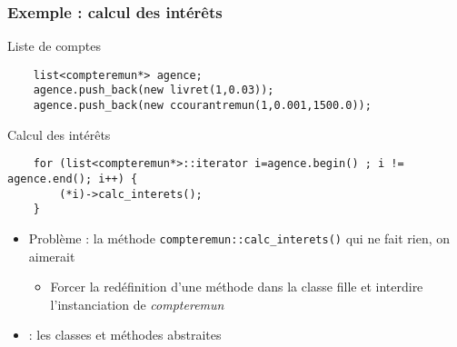 \begin{frame}[fragile]\frametitle{Exemple : calcul des intérêts}
\begin{codeblock}{Liste de comptes}
\begin{lstlisting}
    list<compteremun*> agence;
    agence.push_back(new livret(1,0.03));
    agence.push_back(new ccourantremun(1,0.001,1500.0));
\end{lstlisting}
\end{codeblock}

\begin{codeblock}{Calcul des intérêts}
\begin{lstlisting}
    for (list<compteremun*>::iterator i=agence.begin() ; i != agence.end(); i++) {
        (*i)->calc_interets();
    }
\end{lstlisting}
\end{codeblock}

\begin{itemize}
\item \alert{Problème} : la méthode \verb!compteremun::calc_interets()! qui ne fait rien, on aimerait
\begin{itemize}
\item Forcer la redéfinition d'une méthode dans la classe fille et interdire l'instanciation de \textit{compteremun}
\end{itemize}
\item {} : les classes et méthodes abstraites
\end{itemize}
\end{frame}